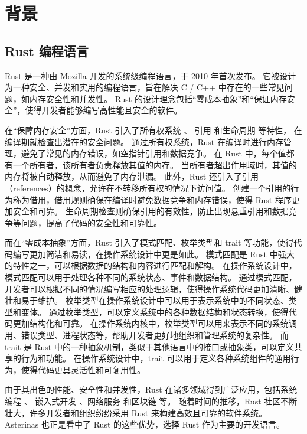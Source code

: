 
\chapter{背景}
\section{Rust 编程语言}
Rust\parencite{matsakis2014rust} 是一种由 Mozilla 开发的系统级编程语言，于 2010 年首次发布。
它被设计为一种安全、并发和实用的编程语言，旨在解决 C / C++ 中存在的一些常见问题，如内存安全性和并发性。
Rust 的设计理念包括“零成本抽象”和“保证内存安全”，使得开发者能够编写高性能且安全的软件。

在“保障内存安全”方面，Rust 引入了所有权系统\parencite{rust_owner,rust_owner1} 、
引用\parencite{rust_ref} 和生命周期\parencite{rust_lifetime,rust_lifetime1} 等特性，
在编译期就检查出潜在的安全问题。
通过所有权系统，Rust 在编译时进行内存管理，避免了常见的内存错误，如空指针引用和数据竞争。
在 Rust 中，每个值都有一个所有者，该所有者负责释放其值的内存。
当所有者超出作用域时，其值的内存将被自动释放，从而避免了内存泄漏。
此外，Rust 还引入了引用（references）的概念，允许在不转移所有权的情况下访问值。
创建一个引用的行为称为借用，借用规则确保在编译时避免数据竞争和内存错误，使得 Rust 程序更加安全和可靠。
生命周期检查则确保引用的有效性，防止出现悬垂引用和数据竞争等问题，提高了代码的安全性和可靠性。

而在“零成本抽象”方面，Rust 引入了模式匹配\parencite{rust_match}、枚举类型\parencite{rust_enum}和 trait\parencite{rust_trait} 等功能，使得代码编写更加简洁和易读，在操作系统设计中更是如此。
模式匹配是 Rust 中强大的特性之一，可以根据数据的结构和内容进行匹配和解构。
在操作系统设计中，模式匹配可以用于处理各种不同的系统状态、事件和数据结构。
通过模式匹配，开发者可以根据不同的情况编写相应的处理逻辑，使得操作系统代码更加清晰、健壮和易于维护。
枚举类型在操作系统设计中可以用于表示系统中的不同状态、类型和变体。
通过枚举类型，可以定义系统中的各种数据结构和状态转换，使得代码更加结构化和可靠。
在操作系统内核中，枚举类型可以用来表示不同的系统调用、错误类型、进程状态等，帮助开发者更好地组织和管理系统的复杂性。
而 trait 是 Rust 中的一种抽象机制，类似于其他语言中的接口或抽象类，可以定义共享的行为和功能。
在操作系统设计中，trait 可以用于定义各种系统组件的通用行为，使得代码更具灵活性和可复用性。

由于其出色的性能、安全性和并发性，Rust 在诸多领域得到广泛应用，包括系统编程\parencite{balasubramanian2017system} 、
嵌入式开发\parencite{borgsmuller2021rust} 、网络服务\parencite{chanda2018network} 和区块链\parencite{rusch2019themis} 等。
随着时间的推移，Rust 社区不断壮大，许多开发者和组织纷纷采用 Rust 来构建高效且可靠的软件系统。
Asterinas 也正是看中了 Rust 的这些优势，选择 Rust 作为主要的开发语言。

